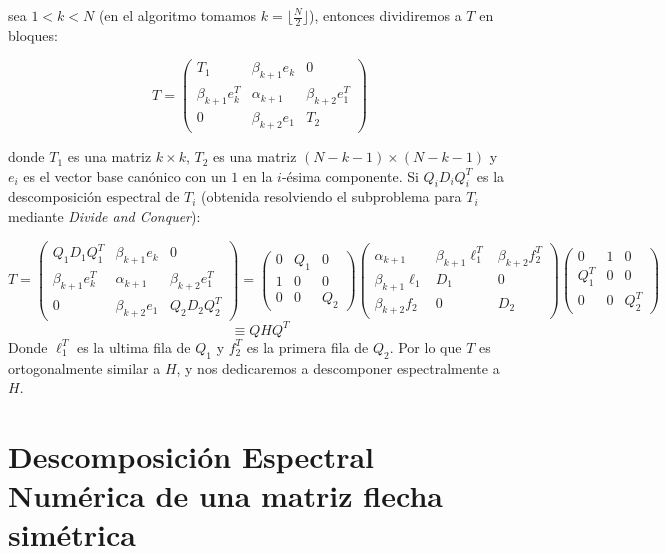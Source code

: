 \documentclass[11pt,a4paper]{article}
\begin{document}
sea $1<k<N$ (en el algoritmo tomamos $k= \lfloor \frac N2 \rfloor$), entonces dividiremos a $T$ en bloques:

$$T=\begin{pmatrix}
        T_1 & \beta_{k+1} e_k & 0 \\
        \beta_{k+1} e_k^T & \alpha_{k+1} & \beta_{k+2} e_1^T \\
        0 & \beta_{k+2} e_1 & T_2
\end{pmatrix}$$

    donde $T_1$ es una matriz $k\times k$, $T_2$ es una matriz $(N-k-1) \times (N-k-1)$ y $e_i$ es el vector base canónico con un $1$ en la $i$-ésima componente. Si $Q_iD_iQ_i^T$ es la descomposición espectral de $T_i$ (obtenida resolviendo el subproblema para $T_i$ mediante \textit{Divide and Conquer}):

    $$T=\begin{pmatrix}
        Q_1 D_1 Q_1^T & \beta_{k+1} e_k & 0 \\
        \beta_{k+1} e_k^T & \alpha_{k+1} & \beta_{k+2} e_1^T \\
        0 & \beta_{k+2} e_1 & Q_2 D_2 Q_2^T
\end{pmatrix}= \begin{pmatrix}
        0 & Q_1 & 0 \\
        1 & 0 & 0 \\
        0 & 0 & Q_2  
\end{pmatrix} \begin{pmatrix}
        \alpha_{k+1} & \beta_{k+1} \ell_1^T & \beta_{k+2} f_2^T \\
        \beta_{k+1} \ell_1 & D_1 & 0 \\
        \beta_{k+2} f_2 & 0 & D_2 
\end{pmatrix}  \begin{pmatrix}
        0 & 1 & 0 \\
        Q_1^T & 0 & 0 \\
        0 & 0 & Q_2^T  
\end{pmatrix}$$
$$\equiv QHQ^T$$
Donde $\ell_1^T$ es la ultima fila de $Q_1$ y $f_2^T$ es la primera fila de $Q_2$. Por lo que $T$ es ortogonalmente similar a $H$, y nos dedicaremos a descomponer espectralmente a $H$.



\section{Descomposición Espectral Numérica de una matriz flecha simétrica}
\end{document}
